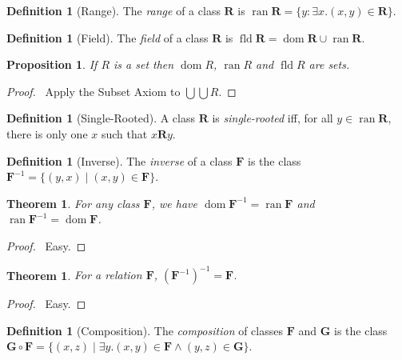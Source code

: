 \documentclass{article}
\let\qed\relax
\newtheorem{proposition}[axiom]{Proposition}
\newtheorem{theorem}[axiom]{Theorem}
\theoremstyle{definition}
\newtheorem{definition}[axiom]{Definition}
\newcommand{\dom}{\ensuremath{\operatorname{dom}}}
\newcommand{\fld}{\ensuremath{\operatorname{fld}}}
\newcommand{\ran}{\ensuremath{\operatorname{ran}}}
\begin{document}
    \begin{definition}[Range]
        The \emph{range} of a class $\mathbf{R}$ is $\ran \mathbf{R} = \{ y : \exists x. (x,y) \in \mathbf{R} \}$.
    \end{definition}

    \begin{definition}[Field]
        The \emph{field} of a class $\mathbf{R}$ is $\fld \mathbf{R} = \dom \mathbf{R} \cup \ran \mathbf{R}$.
    \end{definition}

    \begin{proposition}
        If $R$ is a set then $\dom R$, $\ran R$ and $\fld R$ are sets.
    \end{proposition}

    \begin{proof}
        \pf\ Apply the Subset Axiom to $\bigcup \bigcup R$. \qed
    \end{proof}
    
    \begin{definition}[Single-Rooted]
        A class $\mathbf{R}$ is \emph{single-rooted} iff, for all $y \in \ran \mathbf{R}$,
        there is only one $x$ such that $x \mathbf{R} y$.
    \end{definition}

    \begin{definition}[Inverse]
        The \emph{inverse} of a class $\mathbf{F}$ is the class $\mathbf{F}^{-1} = \{ (y,x)
        \mid (x,y) \in \mathbf{F} \}$.
    \end{definition}

    \begin{theorem}
        For any class $\mathbf{F}$, we have $\dom \mathbf{F}^{-1} = \ran \mathbf{F}$
        and $\ran \mathbf{F}^{-1} = \dom \mathbf{F}$.
    \end{theorem}

    \begin{proof}
        \pf\ Easy. \qed
    \end{proof}

    \begin{theorem}
        For a relation $\mathbf{F}$, $(\mathbf{F}^{-1})^{-1} = \mathbf{F}$.
    \end{theorem}

    \begin{proof}
        \pf\ Easy. \qed
    \end{proof}

    \begin{definition}[Composition]
        The \emph{composition} of classes $\mathbf{F}$ and $\mathbf{G}$ is the class
        $\mathbf{G} \circ \mathbf{F} = \{ (x,z) \mid \exists y. (x,y) \in \mathbf{F} \wedge (y,z) \in \mathbf{G} \}$.
    \end{definition}
\end{document}
